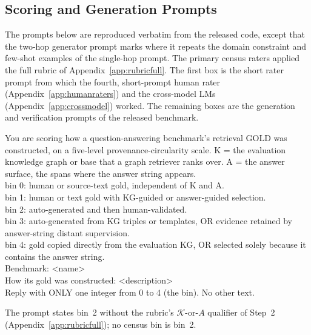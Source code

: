 \documentclass[11pt]{article}
\newcommand{\kg}{\mathcal{K}}
\begin{document}
\subsection{Scoring and Generation Prompts}
\label{app:prompts}
The prompts below are reproduced verbatim from the released code, except that the two-hop generator prompt marks where it repeats the domain constraint and few-shot examples of the single-hop prompt. The primary census raters applied the full rubric of Appendix~\ref{app:rubricfull}. The first box is the short rater prompt from which the fourth, short-prompt human rater (Appendix~\ref{app:humanraters}) and the cross-model LMs (Appendix~\ref{app:crossmodel}) worked. The remaining boxes are the generation and verification prompts of the released benchmark.

\begin{tcolorbox}[breakable, colback=gray!3, colframe=gray!55, colbacktitle=black!75, coltitle=white, boxrule=0.6pt, title=\textbf{Short provenance-circularity rater prompt (cross-model LMs and short-prompt human rater)}, fonttitle=\small\bfseries]
\footnotesize\raggedright{}
You are scoring how a question-answering benchmark's retrieval GOLD was constructed, on a five-level provenance-circularity scale. K = the evaluation knowledge graph or base that a graph retriever ranks over. A = the answer surface, the spans where the answer string appears.\\
bin 0: human or source-text gold, independent of K and A.\\
bin 1: human or text gold with KG-guided or answer-guided selection.\\
bin 2: auto-generated and then human-validated.\\
bin 3: auto-generated from KG triples or templates, OR evidence retained by answer-string distant supervision.\\
bin 4: gold copied directly from the evaluation KG, OR selected solely because it contains the answer string.\\[4pt]
Benchmark: <name>\\
How its gold was constructed: <description>\\[4pt]
Reply with ONLY one integer from 0 to 4 (the bin). No other text.
\end{tcolorbox}

\noindent The prompt states bin~2 without the rubric's $\kg$-or-$A$ qualifier of Step~2 (Appendix~\ref{app:rubricfull}); no census bin is bin~2.
\end{document}
